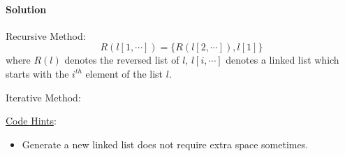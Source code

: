 \paragraph{\color{white} \colorbox{OliveGreen}{Solution}}
Recursive Method:
$$R(l[1,\cdots])=\{R(l[2,\cdots]),l[1]\}$$
where $R(l)$ denotes the reversed list of $l$, $l[i,\cdots]$ denotes a linked list which starts with the $i^{th}$ element of the list $l$.

Iterative Method:

\underline{Code Hints}:
\begin{itemize}
    \item Generate a new linked list does not require extra space sometimes.
\end{itemize}